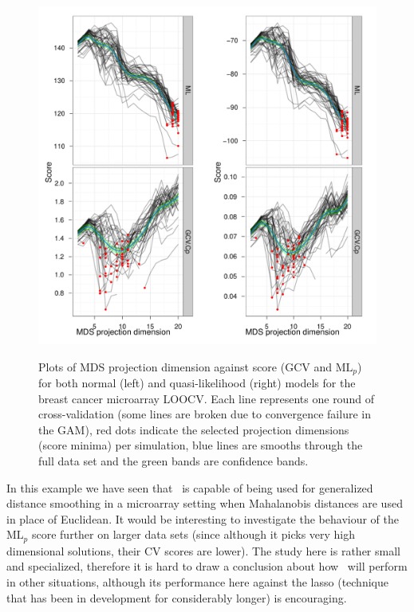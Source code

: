 \begin{figure}
\centering
\includegraphics[width=6in]{gds/figs/breastcancer-dimselect.pdf} \\
\caption{Plots of MDS projection dimension against score (GCV and $\text{ML}_p$) for both normal (left) and quasi-likelihood (right) models for the breast cancer microarray LOOCV. Each line represents one round of cross-validation (some lines are broken due to convergence failure in the GAM), red dots indicate the selected projection dimensions (score minima) per simulation, blue lines are smooths through the full data set and the green bands are confidence bands.}
\label{breastcancer-dimselect}
\end{figure}

In this example we have seen that \mdsds\ is capable of being used for generalized distance smoothing in a microarray setting when Mahalanobis distances are used in place of Euclidean. It would be interesting to investigate the behaviour of the $\text{ML}_p$ score further on larger data sets (since although it picks very high dimensional solutions, their CV scores are lower). The study here is rather small and specialized, therefore it is hard to draw a conclusion about how \mdsds\ will perform in other situations, although its performance here against the lasso (technique that has been in development for considerably longer) is encouraging.

